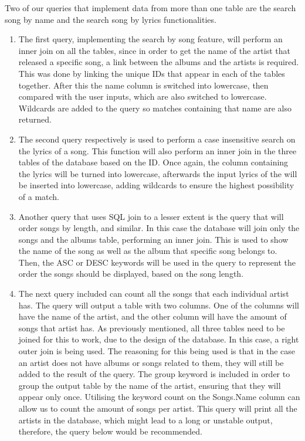 \documentclass[a4paper,12pt]{article}
\begin{document}
Two of our queries that implement data from more than one table are the search song by name and the search song by lyrics functionalities.


\begin{enumerate} 
	\item The first query, implementing the search by song feature, will perform an inner join on all the tables, since in order to get the name of the artist that released a specific song, a link between the albums and the artists is required. This was done by linking the unique IDs that appear in each of the tables together. After this the name column is switched into lowercase, then compared with the user inputs, which are also switched to lowercase. Wildcards are added to the query so matches containing that name are also returned.
	
	\item The second query respectively is used to perform a case insensitive search on the lyrics of a song. This function will also perform an inner join in the three tables of the database based on the ID. Once again, the column containing the lyrics will be turned into lowercase, afterwards the input lyrics of the will be inserted into lowercase, adding wildcards to ensure the highest possibility of a match.

	\item Another query that uses SQL join to a lesser extent is the query that will order songs by length, and similar. In this case the database will join only the songs and the albums table, performing an inner join. This is used to show the name of the song as well as the album that specific song belongs to. Then, the ASC or DESC keywords will be used in the query to represent the order the songs should be displayed, based on the song length.
	
	\item The next query included can count all the songs that each individual artist has. The query will output a table with two columns. One of the columns will have the name of the artist, and the other column will have the amount of songs that artist has. As previously mentioned, all three tables need to be joined for this to work, due to the design of the database. In this case, a right outer join is being used. The reasoning for this being used is that in the case an artist does not have albums or songs related to them, they will still be added to the result of the query. The group keyword is included in order to group the output table by the name of the artist, ensuring that they will appear only once. Utilising the keyword count on the Songs.Name column can allow us to count the amount of songs per artist. This query will print all the artists in the database, which might lead to a long or unstable output, therefore, the query below would be recommended.
	

\end{enumerate}
\end{document}
